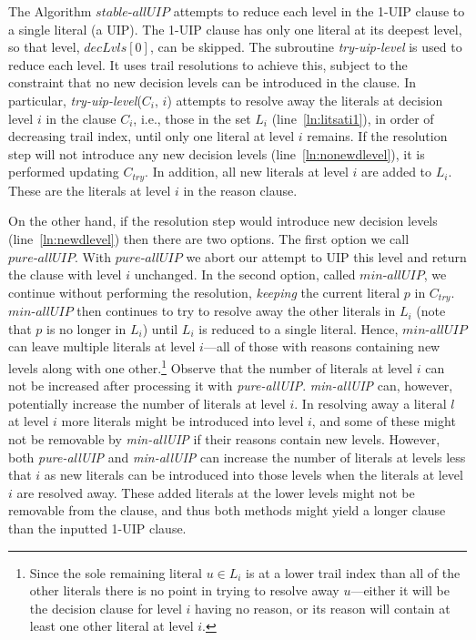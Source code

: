 \documentclass[runningheads]{llncs}
\newcommand{\allUip}{\textit{stable-allUIP}}
\newcommand{\tryuiplevel}{\textit{try-uip-level}\xspace}
\newcommand{\allUipPure}{\textit{pure-allUIP}\xspace}
\newcommand{\allUipMin}{\textit{min-allUIP}\xspace}
\newcommand{\dlevels}{\ensuremath{\mathit{decLvls}}}
\newcommand{\ctry}{C_{\mathit{try}}}
\newcommand{\nf}[1]{{\color{red}{#1}}}
\begin{document}
The Algorithm $\allUip$ attempts to reduce each level in the 1-UIP
clause to a single literal (a UIP). The 1-UIP clause has only one
literal at its deepest level, so that level, $\dlevels[0]$, can be
skipped. The subroutine \tryuiplevel is used to reduce each level. It
uses trail resolutions to achieve this, subject to the constraint that
no new decision levels can be introduced in the clause. In particular,
\tryuiplevel($C_i$, $i$) attempts to resolve away the literals at
decision level $i$ in the clause $C_i$, i.e., those in the set $L_i$
(line~\ref{ln:litsati1}), in order of decreasing trail index, until
only one literal at level $i$ remains. If the resolution step will not
introduce any new decision levels (line~\ref{ln:nonewdlevel}), it is
performed updating $\ctry$. In addition, all new literals at level $i$
are added to $L_i$. These are the literals at level $i$ in the reason
clause.

On the other hand, if the resolution step would introduce new decision
levels (line~\ref{ln:newdlevel}) then there are two options.  The
first option we call $\allUipPure$. With $\allUipPure$ we abort our
attempt to UIP this level and return the clause with level $i$
unchanged. In the second option, called $\allUipMin$, we continue
without performing the resolution, \textit{keeping} the current
literal $p$ in $\ctry$. $\allUipMin$ then continues to try to resolve
away the other literals in $L_i$ (note that $p$ is no longer in $L_i$)
until $L_i$ is reduced to a single literal. Hence, $\allUipMin$ can
leave multiple literals at level $i$---all of those with reasons
containing new levels along with one other.\footnote{Since the sole
  remaining literal $u\in L_i$ is at a lower trail index than all of
  the other literals  there is no point in trying to resolve away
  $u$---either it will be the decision clause for level $i$ having no
  reason, or its reason will contain at least one other literal at
  level $i$.} Observe that the number of literals at level $i$ can not
be increased after processing it with \allUipPure. \allUipMin can,
however, potentially increase the number of literals at level $i$. In
resolving away a literal $l$ at level $i$\nf{,} more literals might be
introduced into level $i$, and some of these might not be removable by
\allUipMin if their reasons contain new levels. However, both
\allUipPure and \allUipMin can increase the number of literals at
levels less that $i$ as new literals can be introduced into those
levels when the literals at level $i$ are resolved away. These added
literals at the lower levels might not be removable from the clause,
and thus both methods might yield a longer clause than the inputted
1-UIP clause.
\end{document}
